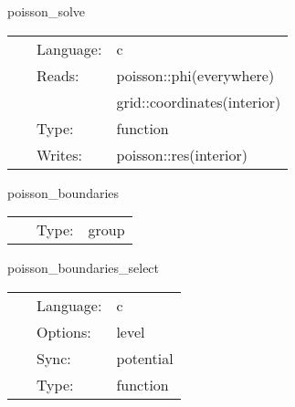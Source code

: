 
\hspace{5mm} poisson\_solve 

\hspace{5mm}{\it calculate uniform charge initial data } 


\hspace{5mm}

 \begin{tabular*}{160mm}{cll} 
~ & Language:  & c \\ 
~ & Reads:  & poisson::phi(everywhere) \\ 
~& ~ &grid::coordinates(interior)\\ 
~ & Type:  & function \\ 
~ & Writes:  & poisson::res(interior) \\ 
\end{tabular*} 


\vspace{5mm}

\noindent {\bf } 

\hspace{5mm} poisson\_boundaries 

\hspace{5mm}{\it apply boundary conditions to initial data } 


\hspace{5mm}

 \begin{tabular*}{160mm}{cll} 
~ & Type:  & group \\ 
\end{tabular*} 


\vspace{5mm}


\hspace{5mm} poisson\_boundaries\_select 

\hspace{5mm}{\it select boundary conditions for initial data } 


\hspace{5mm}

 \begin{tabular*}{160mm}{cll} 
~ & Language:  & c \\ 
~ & Options:  & level \\ 
~ & Sync:  & potential \\ 
~ & Type:  & function \\ 
\end{tabular*} 


